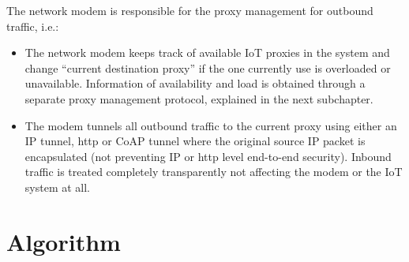 \documentclass[sigplan,screen]{acmart}
\begin{document}
The network modem is responsible for the proxy management for outbound traffic, i.e.:
\begin{itemize}
\item The network modem keeps track of available IoT proxies in the system and change “current destination proxy” if the one currently use is overloaded or unavailable. Information of availability and load is obtained through a separate proxy management protocol, explained in the next subchapter. 
\item The modem tunnels all outbound traffic to the current proxy using either an IP tunnel, http or CoAP tunnel where the original source IP packet is encapsulated (not preventing IP or http level end-to-end security). Inbound traffic is treated completely transparently not affecting the modem or the IoT system at all.
\end{itemize}

\section{Algorithm}
\end{document}
